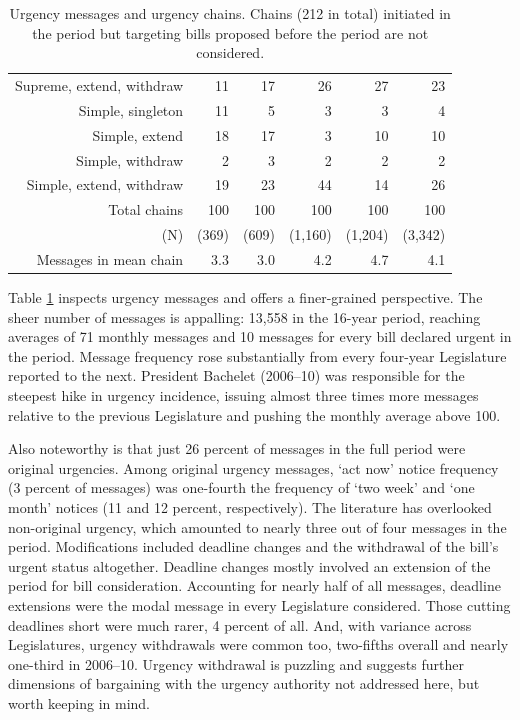 \documentclass[letter,12pt]{article}
\begin{document}
\begin{table}
\begin{tabular}{rrrrr|r}
Supreme, extend, withdraw   & 11 & 17 & 26 & 27 &  23  \\ \hdashline
Simple, singleton           & 11 & 5  & 3  & 3  &   4  \\
Simple, extend              & 18 & 17 & 3  & 10 &  10  \\
Simple, withdraw            & 2  & 3  & 2  & 2  &   2  \\
Simple, extend, withdraw    & 19 & 23 & 44 & 14 &  26  \\ \hline
Total chains                & 100 & 100 & 100 & 100 & 100  \\
(N)                         & (369) & (609) & (1,160) & (1,204) &(3,342) \\ 
Messages in mean chain      & 3.3   & 3.0   & 4.2     & 4.7     & 4.1 \\ \hline
\end{tabular}
\caption{Urgency messages and urgency chains. Chains (212 in total) initiated in the period but targeting bills proposed before the period are not considered.}\label{t:freqUrg}
\end{table}

Table \ref{t:freqUrg} inspects urgency messages and offers a finer-grained perspective. The sheer number of messages is appalling: 13,558 in the 16-year period, reaching averages of 71 monthly messages and 10 messages for every bill declared urgent in the period. Message frequency rose substantially from every four-year Legislature reported to the next. President Bachelet (2006--10) was responsible for the steepest hike in urgency incidence, issuing almost three times more messages relative to the previous Legislature and pushing the monthly average above 100. 

Also noteworthy is that just 26 percent of messages in the full period were original urgencies. Among original urgency messages, `act now' notice frequency (3 percent of messages) was one-fourth the frequency of `two week' and `one month' notices (11 and 12 percent, respectively). The literature has overlooked non-original urgency, which amounted to nearly three out of four messages in the period. Modifications included deadline changes and the withdrawal of the bill's urgent status altogether. Deadline changes mostly involved an extension of the period for bill consideration. Accounting for nearly half of all messages, deadline extensions were the modal message in every Legislature considered. Those cutting deadlines short were much rarer, 4 percent of all. And, with variance across Legislatures, urgency withdrawals were common too, two-fifths overall and nearly one-third in 2006--10. Urgency withdrawal is puzzling and suggests further dimensions of bargaining with the urgency authority not addressed here, but worth keeping in mind. 
\end{document}
